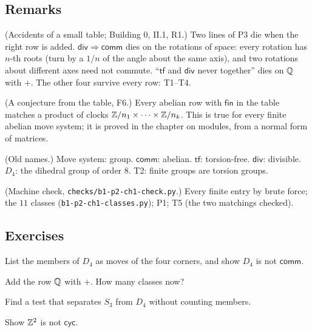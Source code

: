 \subsection*{Remarks}

\begin{lines}
\item[\lab{R1}] (Accidents of a small table; Building 0, II.1, R1.) Two lines of P3 die when the right row is added. $\mathsf{div} \Rightarrow \mathsf{comm}$ dies on the rotations of space: every rotation has $n$-th roots (turn by a $1/n$ of the angle about the same axis), and two rotations about different axes need not commute. ``$\mathsf{tf}$ and $\mathsf{div}$ never together'' dies on $\mathbb{Q}$ with $+$. The other four survive every row: T1--T4.
\item[\lab{R2}] (A conjecture from the table, F6.) Every abelian row with $\mathsf{fin}$ in the table matches a product of clocks $\mathbb{Z}/n_1 \times \dots \times \mathbb{Z}/n_k$. This is true for every finite abelian move system; it is proved in the chapter on modules, from a normal form of matrices.
\item[\lab{R3}] (Old names.) Move system: group. $\mathsf{comm}$: abelian. $\mathsf{tf}$: torsion-free. $\mathsf{div}$: divisible. $D_4$: the dihedral group of order $8$. T2: finite groups are torsion groups.
\item[\lab{R4}] (Machine check, \texttt{checks/b1-p2-ch1-check.py}.) Every finite entry by brute force; the $11$ classes (\texttt{b1-p2-ch1-classes.py}); P1; T5 (the two matchings checked).
\end{lines}

\subsection*{Exercises}

\begin{lines}
\item[\lab{E1}] List the members of $D_4$ as moves of the four corners, and show $D_4$ is not $\mathsf{comm}$.
\item[\lab{E2}] Add the row $\mathbb{Q}$ with $+$. How many classes now?
\item[\lab{E3}] Find a test that separates $S_3$ from $D_4$ without counting members.
\item[\lab{E4}] Show $\mathbb{Z}^2$ is not $\mathsf{cyc}$.
\end{lines}

\newpage

